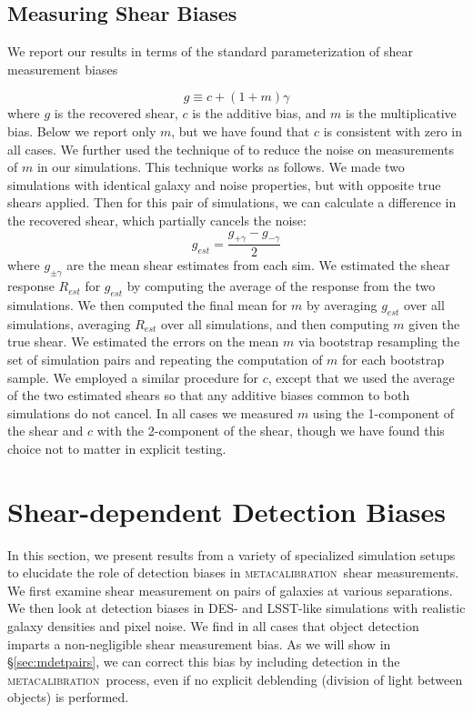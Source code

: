\documentclass[fleqn,useAMS,usenatbib]{mnras}
\newcommand{\mcal}{\textsc{metacalibration}}
\begin{document}
\subsection{Measuring Shear Biases}

We report our results in terms of the standard parameterization of shear
measurement biases \citep[see, e.g.,][]{heymans2006}

\begin{equation}
g \equiv c + (1 + m)\gamma
\end{equation}
where $g$ is the recovered shear, $c$ is the additive bias, and $m$ is the
multiplicative bias. Below we report only $m$, but we have found that $c$ is
consistent with zero in all cases. We further used the technique of
\citet{pujol2019} to reduce the noise on measurements of $m$ in our simulations.
This technique works as follows. We made two simulations with identical galaxy
and noise properties, but with opposite true shears applied. Then for this pair
of simulations, we can calculate a difference in the recovered shear, which
partially cancels the noise:
\begin{equation}
g_{est} = \frac{g_{+\gamma} - g_{-\gamma}}{2}
\end{equation}
where $g_{\pm\gamma}$ are the mean shear estimates from each sim. We estimated
the shear response $R_{est}$ for $g_{est}$ by computing the average of the
response from the two simulations.  We then computed the final mean for $m$ by
averaging $g_{est}$ over all simulations, averaging $R_{est}$ over all
simulations, and then computing $m$ given the true shear. We estimated the
errors on the mean $m$ via bootstrap resampling the set of simulation pairs and
repeating the computation of $m$ for each bootstrap sample. We employed a
similar procedure for $c$, except that we used the average of the two estimated
shears so that any additive biases common to both simulations do not cancel. In
all  cases we measured $m$ using the 1-component of the shear and $c$ with the
2-component of the shear, though we have found this choice not to matter in
explicit testing.

\section{Shear-dependent Detection Biases}\label{sec:detbiases}

In this section, we present results from a variety of specialized simulation
setups to elucidate the role of detection biases in \mcal\ shear measurements.
We first examine shear measurement on pairs of galaxies at various separations.
We then look at detection biases in DES- and LSST-like simulations with
realistic galaxy densities and pixel noise. We find in all cases that object
detection imparts a non-negligible shear measurement bias. As we will show in
\S \ref{sec:mdetpairs}, we can correct this bias by including detection in the
\mcal\ process, even if no explicit deblending (division of light between
objects) is performed.
\end{document}
